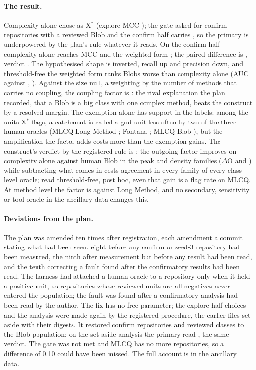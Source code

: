 \documentclass[11pt,a4paper]{article}
\newcommand{\sig}[1]{\texttt{#1}}
\newcommand{\Xs}{X$^*$}
\newcommand{\dO}{$\Delta$O}
\begin{document}
\paragraph{The result.} Complexity alone chose \sig{\xClass} as \Xs{}
(explore MCC \xClassMcc{}); the gate asked for \gateRequired{} confirm
repositories with a reviewed Blob and the confirm half carries
\primGateReposWithBlob{}, so the primary is underpowered by the plan's rule
whatever it reads. On the confirm half complexity alone reaches MCC
\primXMcc{} and the weighted form \primDMcc{}; the paired difference is
\textbf{\primMicro{}}, verdict \textbf{\primVerdict}. The hypothesised
shape is inverted, recall up and precision down, and threshold-free the
weighted form ranks Blobs worse than complexity alone (AUC \primAucD{}
against \primAucX{}, \primAucDiff{}). Against the size null, a weighting by
the number of methods that carries no coupling, the coupling factor is
\textbf{\primDvsNMicro{}}: the rival explanation the plan recorded, that a
Blob is a big class with one complex method, beats the construct by a
resolved margin. The exemption alone has support in the labels: among the units \Xs{}
flags, a catchment is called a god unit less often by two of the three
human oracles (MLCQ Long Method \leafMethodDiff{}; Fontana
\leafFontanaReading{}; MLCQ Blob \leafReading{}), but the amplification
the factor adds costs more than the exemption gains. The construct's
verdict by the registered rule is \textbf{\consVerdict}: the outgoing
factor improves on complexity alone against human Blob in the peak and
density families (\dO{} \pOneOPeak{} and \pOneODensity{}) while subtracting
what comes in costs agreement in every family of every class-level oracle;
read threshold-free, post hoc, even that gain is a flag rate on MLCQ. At
method level the factor is \methMicro{} against Long Method, and no
secondary, sensitivity or tool oracle in the ancillary data changes this.

\paragraph{Deviations from the plan.} The plan was amended ten times after
registration, each amendment a commit stating what had been seen: eight
before any confirm or seed-3 repository had been measured, the ninth after
measurement but before any result had been read, and the tenth correcting
a fault found after the confirmatory results had been read. The harness
had attached a human oracle to a repository only when it held a positive
unit, so repositories whose reviewed units are all negatives never entered
the population; the fault was found after a confirmatory analysis had been
read by the author. The fix has no
free parameter; the explore-half choices and the analysis were made again
by the registered procedure, the earlier files set aside with their
digests. It restored \restoredBlobRepos{} confirm repositories and
\restoredBlobUnits{} reviewed classes to the Blob population; on the
set-aside analysis the primary read \priorPrimMicro{}, the same verdict.
The gate was not met and MLCQ has no more repositories, so a difference of
0.10 could have been missed. The full account is in the ancillary data.
\end{document}
